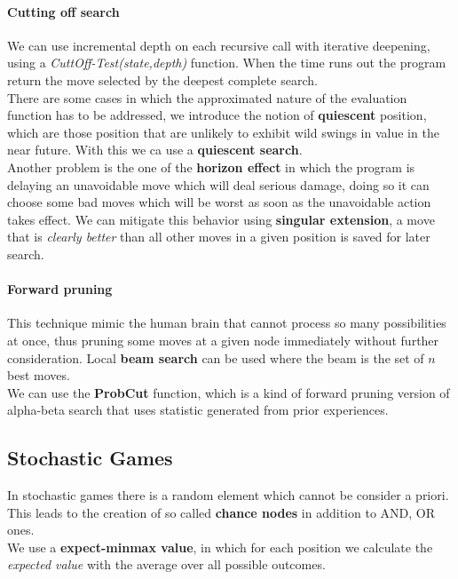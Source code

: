 \documentclass[10pt,a4paper]{article}
\begin{document}
\paragraph{Cutting off search}
We can use incremental depth on each recursive call with iterative deepening, using a \textit{CuttOff-Test(state,depth)} function. When the time runs out the program return the move selected by the deepest complete search.\\
There are some cases in which the approximated nature of the evaluation function has to be addressed, we introduce the notion of \textbf{quiescent} position, which are those position that are unlikely to exhibit wild swings in value in the near future. With this we ca use a \textbf{quiescent search}.\\
Another problem is the one of the \textbf{horizon effect} in which the program is delaying an unavoidable move which will deal serious damage, doing so it can choose some bad moves which will be worst as soon as the unavoidable action takes effect. We can mitigate this behavior using \textbf{singular extension}, a move that is \textit{clearly better} than all other moves in a given position is saved for later search.

\paragraph{Forward pruning}
This technique mimic the human brain that cannot process so many possibilities at once, thus pruning  some moves at a given node immediately without further consideration. Local \textbf{beam search} can be used where the beam is the set of $n$ best moves.\\
We can use the \textbf{ProbCut} function, which is a kind of forward pruning version of alpha-beta search that uses statistic generated from prior experiences.

\subsection{Stochastic Games}
In stochastic games there is a random element which cannot be consider a priori. This leads to the creation of so called \textbf{chance nodes} in addition to AND, OR ones.\\
We use a \textbf{expect-minmax value}, in which for each position we calculate the \textit{expected value} with the average over all possible outcomes. 
\newpage
\end{document}
